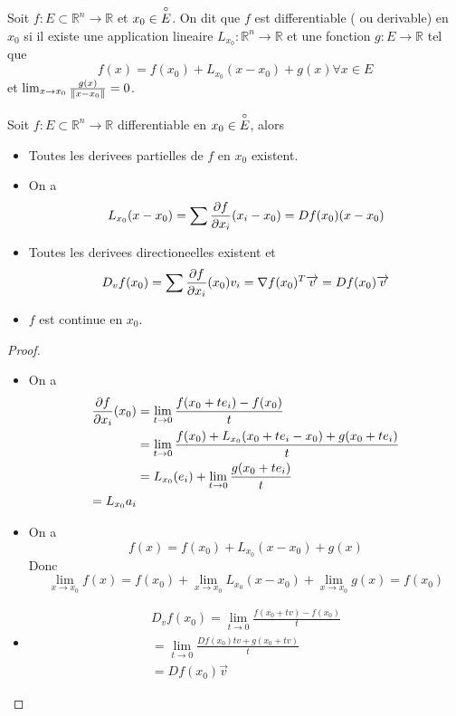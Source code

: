 \documentclass[../main.tex]{subfiles}
\begin{document}
\begin{defn}[Differentiabilite]
	Soit $f:E \subset \mathbb{R}^n \to \mathbb{R}$ et $x_0 \in \overset{\circ}{E}$. On dit que $f$ est differentiable ( ou derivable)  en $x_0$ si il existe une application lineaire $L_{x_0} : \mathbb{R}^n \to \mathbb{R}$ et une fonction $g: E \to \mathbb{R}$ tel que 
	\[ 
		f( x) = f( x_0) + L_{x_0}( x-x_0) + g( x) \forall x \in E
	\]
	et $\lim_{x \to x_0} \frac{g( x) }{\left\lVert x-x_0\right\rVert}=0$.
	
\end{defn}
\begin{thm}
Soit $f: E \subset \mathbb{R}^n \to \mathbb{R} $ differentiable en $x_0 \in \overset{\circ}{E}$, alors
\begin{itemize}
\item Toutes les derivees partielles de $f$ en $x_0$ existent.
\item On a 
\[ 
	L_{x_0} ( x-x_0) = \sum \frac{\partial f}{\partial x_i}( x_i - x_{0} ) = Df( x_0) ( x-x_0) 
\]
\item Toutes les derivees directioneelles existent et
	\[ 
		D_{v} f( x_0) = \sum \frac{\partial f}{\partial x_i}( x_0) v_i = \nabla f( x_0)^{T}\overrightarrow{v} = D f( x_0) \overrightarrow{v}
	\]

\item $f$ est continue en $x_0$.
	
\end{itemize}
\end{thm}
\begin{proof}
\begin{itemize}

\item On a
	\begin{align*}
		\frac{\partial f}{\partial x_i}( x_0) &= \lim_{t \to 0} \frac{f( x_0 + t e_i) -f( x_0) }{t}\\
					      &= \lim_{t \to 0} \frac{f( x_0) + L_{x_0} ( x_0+ t e_i - x_0) + g( x_0+ t e_i) }{t}\\
					      &= L_{x_0}( e_i)  + \lim_{t \to 0} \frac{g( x_0 + t e_i) }{t}\\
					      = L_{x_0} a_i
	\end{align*}
	
\item On a 
	\[ 
		f( x) = f( x_0) + L_{x_0} ( x-x_0) + g( x) 
	\]
	Donc
	\[ 
		\lim_{x \to x_0} f( x) = f( x_0)  + \lim_{x \to x_0} L_{x_0} ( x-x_0) + \lim_{x \to x_0} g( x) = f( x_0) 
	\]


\item 
	\begin{align*}
		D_v f( x_0) = \lim_{t \to 0} \frac{f( x_0 + tv) - f( x_0) }{t}\\
		= \lim_{t \to 0}  \frac{D f( x_0) t v + g ( x_0 + tv) }{t}\\
		= Df( x_0)  \vec{v}
	\end{align*}
	
	
	
\end{itemize}

\end{proof}
\end{document}
